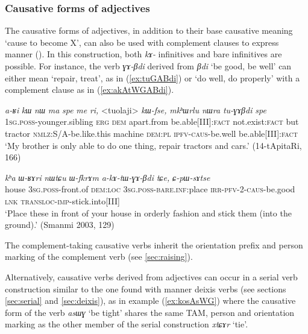 \documentclass[oneside,a4paper,11pt]{article}
\newcommand{\ipa}[1]{\textit{\phon#1}}
\newcommand{\jpg}[2]{\ipa{#1} `#2'}
\newcommand{\refb}[1]{(\ref{#1})}
\begin{document}
\subsubsection{Causative forms of adjectives} \label{sec:adj.caus}
The causative forms of adjectives, in addition to their base causative meaning `cause to become X', can also be used with complement clauses to express manner (\citealt[184]{jacques15causative}). In this construction, both  \ipa{kɤ-} infinitives and bare infinitives are possible. For instance, the verb \ipa{ɣɤ-βdi} derived from \jpg{βdi}{be good, be well} can either mean `repair, treat', as in \refb{ex:tuGABdi} or `do well, do properly' with a complement clause as in \refb{ex:akAtWGABdi}.

\begin{exe}
\ex \label{ex:tuGABdi}
 \gll \ipa{a-ʁi} 	\ipa{kɯ} 	\ipa{nɯ} 	\ipa{ma} 	\ipa{spe} 	\ipa{me} 	\ipa{ri,} 	<tuolaji> 	\ipa{kɯ-fse,} 	\ipa{mkʰɯrlu} 	\ipa{nɯra} 	\ipa{tu-ɣɤβdi} 	\ipa{spe} \\
 \textsc{1sg.poss}-younger.sibling \textsc{erg} \textsc{dem} apart.from be.able[III]:\textsc{fact} not.exist:\textsc{fact} but tractor \textsc{nmlz}:S/A-be.like.this machine \textsc{dem:pl} \textsc{ipfv-caus}-be.well be.able[III]:\textsc{fact} \\
 \glt `My brother is only able to do one thing, repair tractors and cars.' (14-tApitaRi, 166)
\end{exe}


\begin{exe}
\ex \label{ex:akAtWGABdi}
\gll \ipa{kʰa} 	\ipa{ɯ-ʁɤri} 	\ipa{nɯtɕu} 	\ipa{ɯ-fkrɤm} 	\ipa{a-kɤ-tɯ-ɣɤ-βdi} 	\ipa{tɕe,} 	\ipa{ɕ-pɯ-sɤtse} \\
house \textsc{3sg.poss}-front.of \textsc{dem:loc} \textsc{3sg.poss-bare.inf}:place \textsc{irr-pfv-2-caus}-be.good \textsc{lnk} \textsc{transloc-imp}-stick.into[III] \\
\glt `Place these in front of your house in orderly fashion and stick them (into the ground).' (Smanmi 2003, 129)
\end{exe}

The complement-taking causative verbs inherit the orientation prefix and person marking of the complement verb (see \ref{sec:raising}). 

Alternatively, causative verbs derived from adjectives can occur in a serial verb construction similar to the one found with manner deixis verbs (see sections \ref{sec:serial} and \ref{sec:deixis}), as in example  \refb{ex:kosAsWG} where the causative form of the verb \jpg{asɯɣ}{be tight} shares the same TAM, person and orientation marking as the other member of the serial construction \jpg{xtɕɤr}{tie}.
\end{document}
